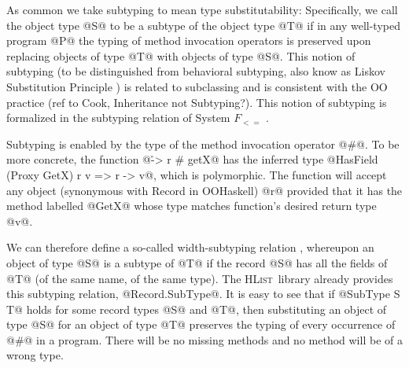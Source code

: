 \documentclass{jfp}
\newcommand{\HList}{\textsc{HList}}
\begin{document}
As common \cite{Poll97} we take subtyping to mean type
substitutability: Specifically, we call the object type @S@ to be a
subtype of the object type @T@ if in any well-typed program @P@ the
typing of method invocation operators is preserved upon replacing
objects of type @T@ with objects of type @S@. This notion of subtyping
(to be distinguished from behavioral subtyping, also know as Liskov
Substitution Principle \cite{LiskovW94}) is related to subclassing and
is consistent with the OO practice (ref to Cook, Inheritance not
Subtyping?). This notion of subtyping is formalized in the subtyping
relation of System $F_{<=}$ \cite{Poll97}.

Subtyping is enabled by the type of the method invocation
operator @#@. To be more concrete, the function @\r -> r # getX@ has
the inferred type @HasField (Proxy GetX) r v => r -> v@, which is
polymorphic. The function will accept any object (synonymous with
Record in OOHaskell) @r@ provided that it has the method labelled
@GetX@ whose type matches function's desired return type @v@.

We can therefore define a so-called width-subtyping relation \cite{Poll97},
whereupon an object of type @S@ is a subtype of @T@ if the record @S@
has all the fields of @T@ (of the same name, of the same type).
The \HList\ library already provides this subtyping relation,
@Record.SubType@. It is easy to see that if @SubType S T@ holds for
some record types @S@ and @T@, then substituting an object of type @S@
for an object of type @T@ preserves the typing of every occurrence of
@#@ in a program. There will be no missing methods and no method
will be of a wrong type.

\end{document}
